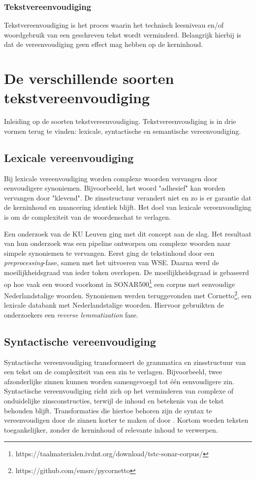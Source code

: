 \subsubsection{Tekstvereenvoudiging}

Tekstvereenvoudiging is het proces waarin het technisch leesniveau en/of woordgebruik van een geschreven tekst wordt verminderd. Belangrijk hierbij is dat de vereenvoudiging geen effect mag hebben op de kerninhoud. 

\section{De verschillende soorten tekstvereenvoudiging}

Inleiding op de soorten tekstvereenvoudiging. Tekstvereenvoudiging is in drie vormen terug te vinden: lexicale, syntactische en semantische vereenvoudiging.

\subsection{Lexicale vereenvoudiging}

Bij lexicale vereenvoudiging worden complexe woorden vervangen door eenvoudigere synoniemen. Bijvoorbeeld, het woord "adhesief" kan worden vervangen door "klevend". De zinsstructuur verandert niet en zo is er garantie dat de kerninhoud en nuancering identiek blijft. Het doel van lexicale vereenvoudiging is om de complexiteit van de woordenschat te verlagen.

Een onderzoek van de KU Leuven \textcite{Bulte2018} ging met dit concept aan de slag. Het resultaat van hun onderzoek was een pipeline ontworpen om complexe woorden naar simpele synoniemen te vervangen. Eerst ging de tekstinhoud door een \textit{preprocessing}-fase, samen met het uitvoeren van WSE. Daarna werd de moeilijkheidsgraad van ieder token overlopen. De moeilijkheidsgraad is gebaseerd op hoe vaak een woord voorkomt in SONAR500\footnote{https://taalmaterialen.ivdnt.org/download/tstc-sonar-corpus/} een corpus met eenvoudige Nederlandstalige woorden. Synoniemen werden teruggevonden met Cornetto\footnote{https://github.com/emsrc/pycornetto}, een lexicale databank met Nederlandstalige woorden. Hiervoor gebruikten de onderzoekers een \textit{reverse lemmatization} fase.

\subsection{Syntactische vereenvoudiging}
Syntactische vereenvoudiging transformeert de grammatica en zinsstructuur van een tekst om de complexiteit van een zin te verlagen. Bijvoorbeeld, twee afzonderlijke zinnen kunnen worden samengevoegd tot één eenvoudigere zin. Syntactische vereenvoudiging richt zich op het verminderen van complexe of onduidelijke zinsconstructies, terwijl de inhoud en betekenis van de tekst behouden blijft. Transformaties die hiertoe behoren zijn de syntax te vereenvoudigen door de zinnen korter te maken of door . Kortom worden teksten toegankelijker, zonder de kerninhoud of relevante inhoud te verwerpen.

